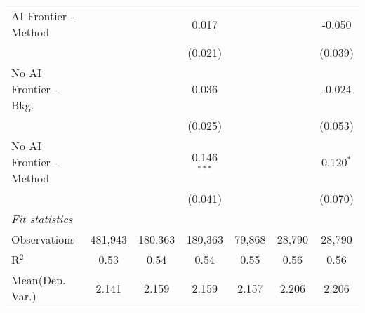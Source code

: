 \begin{tabular}{lcccccc}
   AI Frontier - Method    &               &               & 0.017         &               &               & -0.050\\   
                           &               &               & (0.021)       &               &               & (0.039)\\   
   No AI Frontier - Bkg.   &               &               & 0.036         &               &               & -0.024\\   
                           &               &               & (0.025)       &               &               & (0.053)\\   
   No AI Frontier - Method &               &               & 0.146$^{***}$ &               &               & 0.120$^{*}$\\   
                           &               &               & (0.041)       &               &               & (0.070)\\   
   \midrule
   \emph{Fit statistics}\\
   Observations            & 481,943       & 180,363       & 180,363       & 79,868        & 28,790        & 28,790\\  
   R$^2$                   & 0.53          & 0.54          & 0.54          & 0.55          & 0.56          & 0.56\\  
Mean(Dep. Var.) & 2.141 & 2.159 & 2.159 & 2.157 & 2.206 & 2.206 \\
   

\end{tabular}

